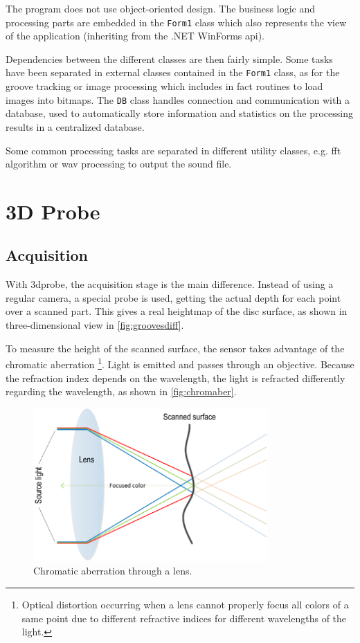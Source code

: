 The program does not use object-oriented design. The business logic and processing parts are embedded in the \texttt{Form1} class which also represents the view of the application (inheriting from the .NET WinForms \gls{api}).

Dependencies between the different classes are then fairly simple. Some tasks have been separated in external classes contained in the \texttt{Form1} class, as for the groove tracking or image processing which includes in fact routines to load images into bitmaps. The \texttt{DB} class handles connection and communication with a database, used to automatically store information and statistics on the processing results in a centralized database.

Some common processing tasks are separated in different utility classes, e.g. \gls{fft} algorithm or \gls{wav} processing to output the sound file.

\section{3D Probe}

\subsection{Acquisition}

With \gls{3dprobe}, the acquisition stage is the main difference. Instead of using a regular camera, a special probe is used, getting the actual depth for each point over a scanned part. This gives a real heightmap of the disc surface, as shown in three-dimensional view in \autoref{fig:groovesdiff}.

To measure the height of the scanned surface, the sensor takes advantage of the chromatic aberration \footnote{Optical distortion occurring when a lens cannot properly focus all colors of a same point due to different refractive indices for different wavelengths of the light.}. Light is emitted and passes through an objective. Because the refraction index depends on the wavelength, the light is refracted differently regarding the wavelength, as shown in \autoref{fig:chromaber}.

\begin{figure}[!ht]
\centering
\includegraphics[width=0.8\textwidth]{images/chromatic-aberration}
\caption{Chromatic aberration through a lens.}
\label{fig:chromaber}
\end{figure}

